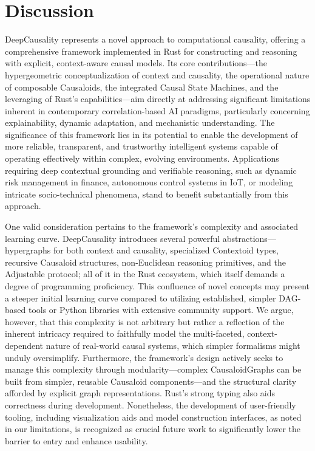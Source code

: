 \section{Discussion}
\label{sec:discussion}

DeepCausality represents a novel approach to computational causality, offering a comprehensive framework implemented in Rust for constructing and reasoning with explicit, context-aware causal models. Its core contributions—the hypergeometric conceptualization of context and causality, the operational nature of composable Causaloids, the integrated Causal State Machines, and the leveraging of Rust's capabilities—aim directly at addressing significant limitations inherent in contemporary correlation-based AI paradigms, particularly concerning explainability, dynamic adaptation, and mechanistic understanding. The significance of this framework lies in its potential to enable the development of more reliable, transparent, and trustworthy intelligent systems capable of operating effectively within complex, evolving environments. Applications requiring deep contextual grounding and verifiable reasoning, such as dynamic risk management in finance, autonomous control systems in IoT, or modeling intricate socio-technical phenomena, stand to benefit substantially from this approach.


One valid consideration pertains to the framework's complexity and associated learning curve. DeepCausality introduces several powerful abstractions—hypergraphs for both context and causality, specialized Contextoid types, recursive Causaloid structures, non-Euclidean reasoning primitives, and the Adjustable protocol; all of it in the Rust ecosystem, which itself demands a degree of programming proficiency. This confluence of novel concepts may present a steeper initial learning curve compared to utilizing established, simpler DAG-based tools or Python libraries with extensive community support. We argue, however, that this complexity is not arbitrary but rather a reflection of the inherent intricacy required to faithfully model the multi-faceted, context-dependent nature of real-world causal systems, which simpler formalisms might unduly oversimplify. Furthermore, the framework's design actively seeks to manage this complexity through modularity—complex CausaloidGraphs can be built from simpler, reusable Causaloid components—and the structural clarity afforded by explicit graph representations. Rust's strong typing also aids correctness during development. Nonetheless, the development of user-friendly tooling, including visualization aids and model construction interfaces, as noted in our limitations, is recognized as crucial future work to significantly lower the barrier to entry and enhance usability.

